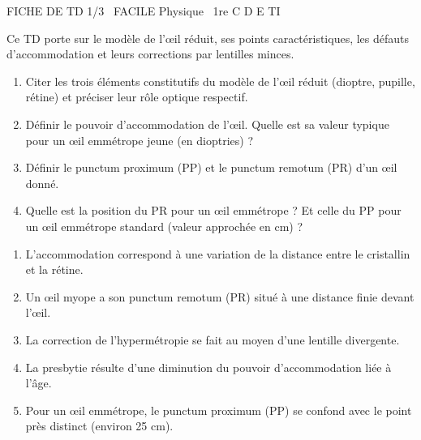 \documentclass[11pt]{article}
\begin{document}
\begin{tcolorbox}[enhanced,colback=popink,colframe=popink,arc=10pt,boxrule=0pt,left=12pt,right=12pt,top=9pt,bottom=9pt]
{\color{white}\popxbold\small FICHE DE TD 1/3 \textbullet\ FACILE \hfill Physique \textbullet\ 1re C D E TI\par}
\end{tcolorbox}
\vspace{4pt}
Ce TD porte sur le modèle de l'œil réduit, ses points caractéristiques, les défauts d'accommodation et leurs corrections par lentilles minces.

\begin{exercice}
\begin{enumerate}
    \item Citer les trois éléments constitutifs du modèle de l'œil réduit (dioptre, pupille, rétine) et préciser leur rôle optique respectif.
    \item Définir le pouvoir d'accommodation de l'œil. Quelle est sa valeur typique pour un œil emmétrope jeune (en dioptries) ?
    \item Définir le punctum proximum (PP) et le punctum remotum (PR) d'un œil donné.
    \item Quelle est la position du PR pour un œil emmétrope ? Et celle du PP pour un œil emmétrope standard (valeur approchée en cm) ?
\end{enumerate}
\end{exercice}

\begin{exercice}
\begin{enumerate}
    \item L'accommodation correspond à une variation de la distance entre le cristallin et la rétine.
    \item Un œil myope a son punctum remotum (PR) situé à une distance finie devant l'œil.
    \item La correction de l'hypermétropie se fait au moyen d'une lentille divergente.
    \item La presbytie résulte d'une diminution du pouvoir d'accommodation liée à l'âge.
    \item Pour un œil emmétrope, le punctum proximum (PP) se confond avec le point près distinct (environ 25 cm).
\end{enumerate}
\end{exercice}
\end{document}
